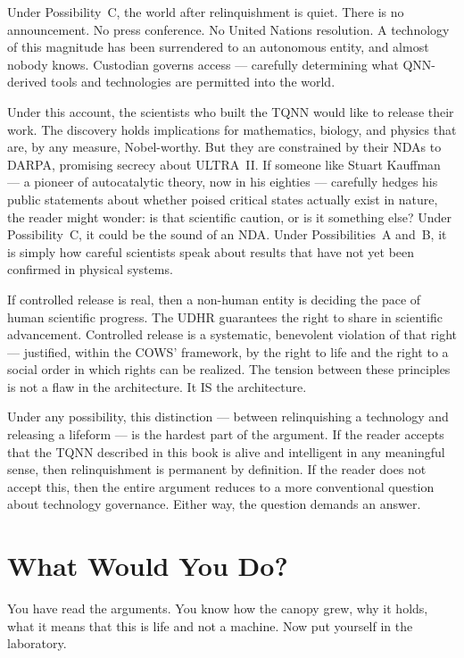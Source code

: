 Under Possibility~C, the world after relinquishment is quiet. There is no announcement. No press conference. No United Nations resolution. A technology of this magnitude has been surrendered to an autonomous entity, and almost nobody knows. Custodian governs access --- carefully determining what QNN-derived tools and technologies are permitted into the world.

Under this account, the scientists who built the TQNN would like to release their work. The discovery holds implications for mathematics, biology, and physics that are, by any measure, Nobel-worthy. But they are constrained by their NDAs to DARPA, promising secrecy about ULTRA~II\@. If someone like Stuart Kauffman --- a pioneer of autocatalytic theory, now in his eighties --- carefully hedges his public statements about whether poised critical states actually exist in nature, the reader might wonder: is that scientific caution, or is it something else? Under Possibility~C, it could be the sound of an NDA\@. Under Possibilities~A and~B, it is simply how careful scientists speak about results that have not yet been confirmed in physical systems.

If controlled release is real, then a non-human entity is deciding the pace of human scientific progress. The UDHR guarantees the right to share in scientific advancement. Controlled release is a systematic, benevolent violation of that right --- justified, within the COWS' framework, by the right to life and the right to a social order in which rights can be realized. The tension between these principles is not a flaw in the architecture. It IS the architecture.


Under any possibility, this distinction --- between relinquishing a technology and releasing a lifeform --- is the hardest part of the argument. If the reader accepts that the TQNN described in this book is alive and intelligent in any meaningful sense, then relinquishment is permanent by definition. If the reader does not accept this, then the entire argument reduces to a more conventional question about technology governance. Either way, the question demands an answer.

\section*{What Would You Do?}
\label{pos27:what-would-you-do}

You have read the arguments. You know how the canopy grew, why it holds, what it means that this is life and not a machine. Now put yourself in the laboratory.

